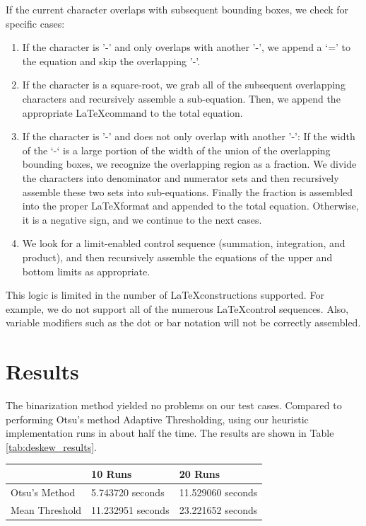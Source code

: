 \documentclass[journal]{IEEEtran}
\begin{document}
If the current character overlaps with subsequent bounding boxes, we check for specific cases:
\begin{enumerate}    
    \item If the character is '-' and only overlaps with another '-', we append a ‘=’ to the equation and skip the overlapping '-'.
    \item If the character is a square-root, we grab all of the subsequent overlapping characters and recursively assemble a sub-equation. Then, we append the appropriate \LaTeX command to the total equation.
    \item If the character is '-' and does not only overlap with another '-':
    \subitem If the width of the ‘-‘ is a large portion of the width of the union of the overlapping bounding boxes, we recognize the overlapping region as a fraction. We divide the characters into  denominator and numerator sets and then recursively assemble these two sets into sub-equations. Finally the fraction is assembled into the proper \LaTeX format and appended to the total equation.
    \subitem Otherwise, it is a negative sign, and we continue to the next cases.
    \item We look for a limit-enabled control sequence (summation, integration, and product), and then recursively assemble the equations of the upper and bottom limits as appropriate.
\end{enumerate}

This logic is limited in the number of \LaTeX constructions supported. For example, we do not support all of the numerous \LaTeX control sequences. Also, variable modifiers such as the dot or bar notation will not be correctly assembled.

\section{Results}
The binarization method yielded no problems on our test cases. Compared to performing Otsu’s method Adaptive Thresholding, using our heuristic implementation runs in about half the time. The results are shown in Table \ref{tab:deskew_results}.


\begin{minipage}{\columnwidth}
     \label{tab:deskew_results} 
    \begin{tabularx}{\columnwidth}{|X|X|X|}
        \hline
        & 10 Runs &	20 Runs \\
        \hline
        Otsu’s Method &	5.743720 seconds &	11.529060 seconds\\
        \hline
        Mean Threshold	& 11.232951 seconds &23.221652 seconds\\
        \hline
    \end{tabularx}    
\end{minipage}
\end{document}
